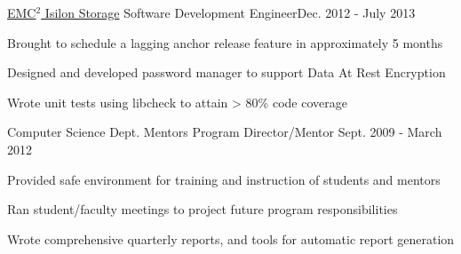 \documentclass{article}
\newenvironment{*mylist}[2]{
  \subsubsection*{#1\hfill\small#2}
  \small
  \begin{list}{}{}
   \setlength{\topsep}{0pt}
   \setlength{\itemsep}{1pt}
   \setlength{\parskip}{0pt}
   \setlength{\parsep}{0pt}}{\end{list}\normalsize}
\newcommand{\LU}[1]{\hspace{-1em}{\bf Languages Used : #1}}
\def\csd{Computer Science Dept. }
\begin{document}
\begin{*mylist}{\href{https://www.emc.com/en-us/storage/isilon/index.htm}{EMC\(^2\) Isilon Storage} \tabb Software Development Engineer}{Dec. 2012 - July 2013}
\item Brought to schedule a lagging anchor release feature in approximately 5 months
\item Designed and developed password manager to support Data At Rest Encryption %
\item Wrote unit tests using libcheck to attain > 80\% code coverage
\item \LU{C, C++, Python, SQLite}
\end{*mylist}

\begin{*mylist}{\csd \tabb Mentors Program Director/Mentor}{
    Sept. 2009
    - March 2012}
\item Provided safe environment for training and instruction of students and mentors
\item Ran student/faculty meetings to project future program responsibilities
\item Wrote comprehensive quarterly reports, and tools for automatic report generation
\item \LU{Ada, C++, Scheme, R}
\end{*mylist}

\begin{comment}
\begin{*mylist}{\csd \tabb Student Mentor}{Sept. 2009 - June 2011}
\item Aided in identifying and debugging student's code
\item Tutored groups and individual students in computer science
\end{*mylist}
\end{comment}
\end{document}
